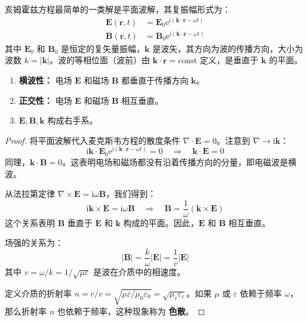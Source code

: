 \documentclass[fontset=none]{ctexart}
\begin{document}
\begin{definition}[平面电磁波]
亥姆霍兹方程最简单的一类解是平面波解，其复振幅形式为：
\begin{equation}
\begin{aligned}
\bm{E}(\bm{r}, t) &= \bm{E}_0 \mathrm{e}^{\mathrm{i}(\bm{k} \cdot \bm{r} - \omega t)} \\
\bm{B}(\bm{r}, t) &= \bm{B}_0 \mathrm{e}^{\mathrm{i}(\bm{k} \cdot \bm{r} - \omega t)}
\end{aligned}
\end{equation}
其中 $\bm{E}_0$ 和 $\bm{B}_0$ 是恒定的复矢量振幅，$\bm{k}$ 是波矢，其方向为波的传播方向，大小为波数 $k=|\bm{k}|$。波的等相位面（波前）由 $\bm{k} \cdot \bm{r} = \text{const}$ 定义，是垂直于 $\bm{k}$ 的平面。
\end{definition}

\begin{proposition}[平面电磁波的性质]
\begin{enumerate}
    \item \textbf{横波性：} 电场 $\bm{E}$ 和磁场 $\bm{B}$ 都垂直于传播方向 $\bm{k}$。
    \item \textbf{正交性：} 电场 $\bm{E}$ 和磁场 $\bm{B}$ 相互垂直。
    \item $\bm{E}, \bm{B}, \bm{k}$ 构成右手系。
\end{enumerate}
\end{proposition}
\begin{proof}
将平面波解代入麦克斯韦方程的散度条件 $\nabla \cdot \bm{E}=0$。注意到 $\nabla \to \mathrm{i}\bm{k}$：
\begin{equation}
\mathrm{i}\bm{k} \cdot \bm{E}_0 \mathrm{e}^{\mathrm{i}(\bm{k} \cdot \bm{r} - \omega t)} = 0 \quad \Rightarrow \quad \bm{k} \cdot \bm{E} = 0
\end{equation}
同理，$\bm{k} \cdot \bm{B} = 0$。这表明电场和磁场都没有沿着传播方向的分量，即电磁波是横波。

从法拉第定律 $\nabla \times \bm{E} = \mathrm{i}\omega\bm{B}$，我们得到：
\begin{equation}
\mathrm{i}\bm{k} \times \bm{E} = \mathrm{i}\omega\bm{B} \quad \Rightarrow \quad \bm{B} = \frac{1}{\omega}(\bm{k} \times \bm{E})
\end{equation}
这个关系表明 $\bm{B}$ 垂直于 $\bm{E}$ 和 $\bm{k}$ 构成的平面。因此，$\bm{E}$ 和 $\bm{B}$ 相互垂直。

场强的关系为：
\begin{equation}
|\bm{B}| = \frac{k}{\omega} |\bm{E}| = \frac{1}{v} |\bm{E}|
\end{equation}
其中 $v = \omega/k = 1/\sqrt{\mu\varepsilon}$ 是波在介质中的相速度。

定义介质的折射率 $n = c/v = \sqrt{\mu\varepsilon/\mu_0\varepsilon_0} = \sqrt{\mu_r \varepsilon_r}$。如果 $\mu$ 或 $\varepsilon$ 依赖于频率 $\omega$，那么折射率 $n$ 也依赖于频率，这种现象称为 \textbf{色散}。
\end{proof}
\end{document}
